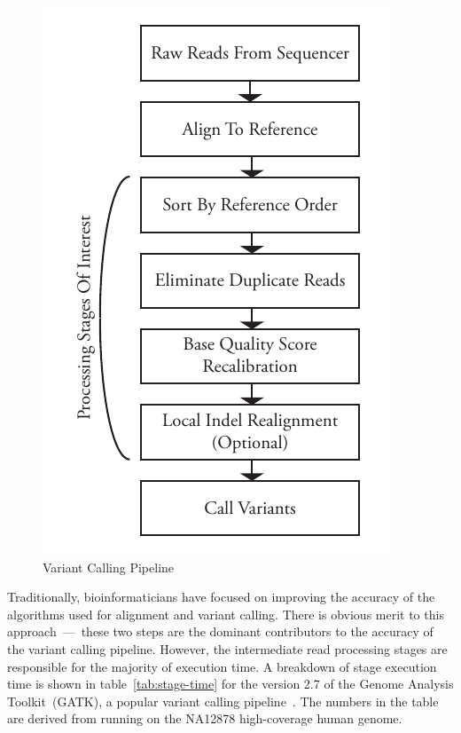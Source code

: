 \documentclass[10pt,twocolumn]{article}
\theoremstyle{plain}
\begin{document}
\begin{figure}[h]
\begin{center}
\includegraphics[width=0.9\linewidth]{pipeline.pdf}
\end{center}
\caption{Variant Calling Pipeline}
\label{fig:pipeline}
\end{figure}

Traditionally, bioinformaticians have focused on improving the accuracy of the algorithms used for alignment and variant
calling. There is obvious merit to this approach~---~these two steps are the dominant contributors to the accuracy of the variant
calling pipeline. However, the intermediate read processing stages are responsible for the majority of execution time. A
breakdown of stage execution time is shown in table~\ref{tab:stage-time} for the version 2.7 of the Genome Analysis
Toolkit~(GATK), a popular variant calling pipeline~\cite{mckenna10}. The numbers in the table are derived from running on
the NA12878 high-coverage human genome.
\end{document}
